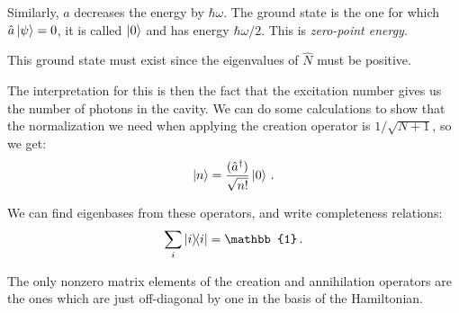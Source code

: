 \documentclass[main.tex]{subfiles}
\begin{document}

Similarly, \(\hat{a}\) decreases the energy by \(\hbar \omega \).  The ground state is the one for which \(\hat{a} \ket{\psi }= 0 \), it is called \(\ket{0} \) and has energy \(\hbar \omega /2\). This is \emph{zero-point energy}. 

This ground state must exist since the eigenvalues of \(\hat{N}\) must be positive.

The interpretation for this is then the fact that the excitation number gives us the number of photons in the cavity. We can do some calculations to show that the normalization we need when applying the creation operator is \(1 / \sqrt{N+1}\), so we get: 
%
\begin{align}
\ket{n}  = \frac{(\hat{a}^\dag)}{\sqrt{n!}} \ket{0} 
\,.
\end{align}

We can find eigenbases from these operators, and write completeness relations:
%
\begin{align}
\sum _{i} \ketbra{i}{i} = \mathbb{1}
\,.
\end{align}

The only nonzero matrix elements of the creation and annihilation operators are the ones which are just off-diagonal by one in the basis of the Hamiltonian. 
\end{document}
